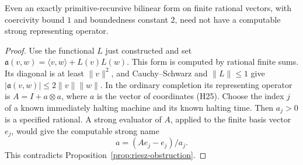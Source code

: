 \begin{corollary}
\label{cor:bilinear-obstruction}
Even an exactly primitive-recursive bilinear form on finite rational vectors,
with coercivity bound \(1\) and boundedness constant \(2\), need not have
a computable strong representing operator.
\end{corollary}
\begin{proof}
Use the functional \(L\) just constructed and set
\(\mathfrak a(v,w)=\langle v,w\rangle+L(v)L(w)\).
This form is computed by rational finite sums. Its diagonal is at least
\(\|v\|^2\), and Cauchy--Schwarz and \(\|L\|\leq1\) give
\(|\mathfrak a(v,w)|\leq2\|v\|\|w\|\).
In the ordinary completion its representing operator is \(A=I+a\otimes a\),
where \(a\) is the vector of coordinates (H25).
Choose the index \(j\) of a known immediately halting machine and its known
halting time. Then \(a_j>0\) is a specified rational. A strong evaluator of
\(A\), applied to the finite basis vector \(e_j\), would give the computable
strong name
\[
                              a=(Ae_j-e_j)/a_j.
\]
This contradicts Proposition~\ref{prop:riesz-obstruction}.
\end{proof}
